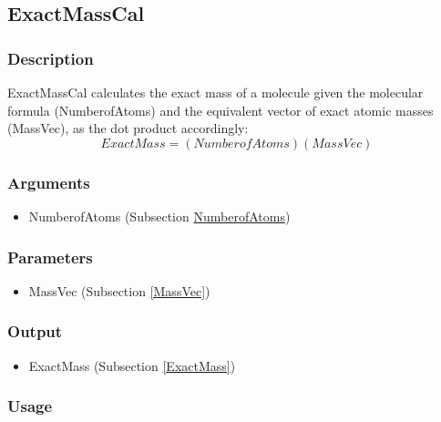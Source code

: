 \subsection{ExactMassCal}\label{ExactMassCal}
\subsubsection{Description}
ExactMassCal calculates the exact mass of a molecule given the molecular formula (NumberofAtoms) and the equivalent vector of exact atomic masses (MassVec), as the dot product accordingly:
\begin{equation}
ExactMass=\left(NumberofAtoms\right)\left(MassVec\right)
\end{equation}

\subsubsection{Arguments}
\begin{itemize}
\item NumberofAtoms (Subsection \hyperref[NumberofAtoms]{NumberofAtoms})
\end{itemize}

\subsubsection{Parameters}
\begin{itemize}
\item MassVec (Subsection \ref{MassVec})
\end{itemize}

\subsubsection{Output}
\begin{itemize}
\item ExactMass (Subsection \ref{ExactMass})
\end{itemize}

\subsubsection{Usage}




